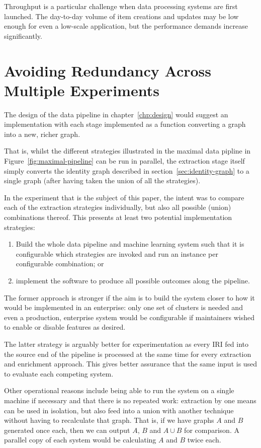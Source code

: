 Throughput is a particular challenge when data processing systems
are first launched. The day-to-day volume of item creations and
updates may be low enough for even a low-scale application, but the
performance demands increase significantly.

\section{Avoiding Redundancy Across Multiple Experiments}

The design of the data pipeline in chapter~\ref{chp:design} would
suggest an implementation with each stage implemented as a function
converting a graph into a new, richer graph.

That is, whilst the different strategies illustrated in the maximal
data pipline in Figure~\ref{fig:maximal-pipeline} can be run in
parallel, the extraction stage itself simply converts the identity
graph described in section~\ref{sec:identity-graph} to a single graph
(after having taken the union of all the strategies).

In the experiment that is the subject of this paper, the intent was
to compare each of the extraction strategies individually, but also
all possible (union) combinations thereof. This presents at least
two potential implementation strategies:

\begin{enumerate}
\item Build the whole data pipeline and machine learning system such
  that it is configurable which strategies are invoked and run an
  instance per configurable combination; or
\item implement the software to produce all possible outcomes along
  the pipeline.
\end{enumerate}

The former approach is stronger if the aim is to build the system
closer to how it would be implemented in an enterprise: only one
set of clusters is needed and even a production, enterprise system
would be configurable if maintainers wished to enable or disable
features as desired.

The latter strategy is arguably better for experimentation as every
IRI fed into the source end of the pipeline is processed at the same
time for every extraction and enrichment approach. This gives better
assurance that the same input is used to evaluate each competing
system.

Other operational reasons include being able to run the system on a
single machine if necessary and that there is no repeated work:
extraction by one means can be used in isolation, but also feed into
a union with another technique without having to recalculate that
graph. That is, if we have graphs $A$ and $B$ generated once each,
then we can output $A$, $B$ and $A \cup B$ for comparison. A parallel copy
of each system would be calculating $A$ and $B$ twice each.

